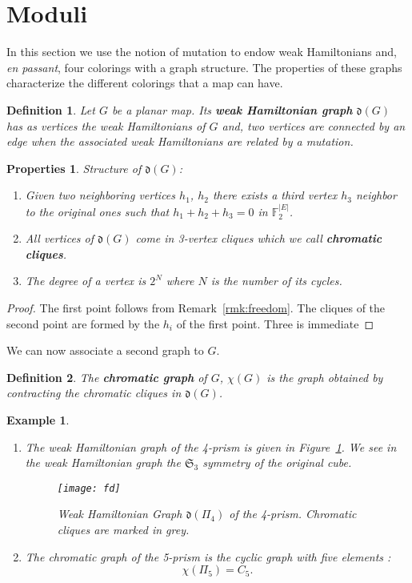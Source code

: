 \documentclass[11pt]{amsart}
\newtheorem{pro}{Properties}[section]
\newtheorem{defi}{Definition}[section]
\newtheorem{ex}{Example}[section]
\begin{document}
\section{Moduli}

In this section we use the notion of mutation to endow weak Hamiltonians and, \emph{en passant}, four colorings with a graph structure. 
The properties of these graphs characterize the different colorings that a map can have.

\begin{defi}
Let $G$ be a planar map.
Its {\bf weak Hamiltonian graph} ${\mathfrak{d}}(G)$ has as vertices the weak Hamiltonians of $G$ and, two vertices are connected by an edge when the associated weak Hamiltonians are related by a mutation.
\end{defi}

\begin{pro}Structure of ${\mathfrak{d}}(G)$:
\begin{enumerate}
\item Given two neighboring vertices $h_1$, $h_2$ there exists a third vertex $h_3$ neighbor to the original ones such that $h_1 + h_2 + h_3 = 0$ in ${\mathbb{F}}_2^{|E|}$.
\item All vertices of ${\mathfrak{d}}(G)$ come in 3-vertex cliques which we call {\bf chromatic cliques}.
\item The degree of a vertex is $2^N$ where $N$ is the number of its cycles.
\end{enumerate}
\end{pro}

\begin{proof}
The first point follows from Remark~\ref{rmk:freedom}. 
The cliques of the second point are formed by the $h_{i}$ of the first point.
Three is immediate
\end{proof}

We can now associate a second graph to $G$.

\begin{defi}
The {\bf chromatic graph} of $G$, $\chi(G)$ is the graph obtained by contracting the chromatic cliques in ${\mathfrak{d}}(G)$.
\end{defi}

\begin{ex}
\begin{enumerate}

\item The weak Hamiltonian graph of the 4-prism is given in Figure~\ref{fig:fdgraph}. We see in the weak Hamiltonian graph the $\mathfrak{S}_3$ symmetry of the original cube.

\begin{figure}[!h]
{\texttt{[image: fd]}}
\caption{Weak Hamiltonian Graph ${\mathfrak{d}}\left(\Pi_4\right)$ of the 4-prism. Chromatic cliques are marked in grey.}
\label{fig:fdgraph}
\end{figure}

\item The chromatic graph of the 5-prism is the cyclic graph with five elements : $$\chi\left(\Pi_5\right)=C_5.$$

\end{enumerate}
\end{ex}
\end{document}
